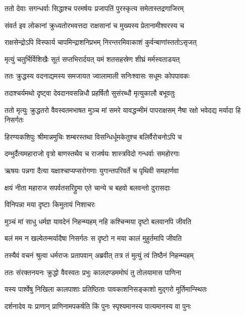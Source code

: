 \twolineshloka
{ततो देवाः सगन्धर्वाः सिद्धाश्च परमर्षयः}
{प्रजापतिं पुरस्कृत्य समेतास्तद्रणाजिरम्} %

\twolineshloka
{संवर्त इव लोकानां क्रुध्यतोरभवत्तदा}
{राक्षसानां च मुख्यस्य प्रेतानामीश्वरस्य च} %

\twolineshloka
{राक्षसेन्द्रोऽपि विस्फार्य चापमिन्द्राशनिप्रभम्}
{निरन्तरमिवाकाशं कुर्वन्बाणांस्ततोऽसृजत्} %

\twolineshloka
{मृत्युं चतुर्भिर्विशिखैः सूतं सप्तभिरार्दयत्}
{यमं शतसहस्रेण शीघ्रं मर्मस्वताडयत्} %

\twolineshloka
{ततः क्रुद्धस्य वदनाद्यमस्य समजायत}
{ज्वालामाली सनिःश्वासः सधूमः कोपपावकः} %

\twolineshloka
{तदाश्चर्यमथो दृष्ट्वा देवदानवसन्निधौ}
{प्रहर्षितौ सुसंरब्धौ मृत्युकालौ बभूवतुः} %

\threelineshloka
{ततो मृत्युः क्रुद्धतरो वैवस्वतमभाषत}
{मुञ्च मां समरे यावद्धन्मीमं पापराक्षसम्}
{नैषा रक्षो भवेदद्य मर्यादा हि निसर्गतः} %

\twolineshloka
{हिरण्यकशिपुः श्रीमान्नमुचिः शम्बरस्तथा}
{विसन्धिर्धूमकेतुश्च बलिर्वैरोचनोऽपि च} %

\twolineshloka
{दम्भुर्दैत्यमहाराजो वृत्रो बाणस्तथैव च}
{राजर्षयः शास्त्रविदो गन्धर्वाः समहोरगाः} %

\twolineshloka
{ऋषयः पन्नगा दैत्या यक्षाश्चाप्यप्सरोगणाः}
{युगान्तपरिवर्ते च पृथिवी समहार्णवा} %

\twolineshloka
{क्षयं नीता महाराज सपर्वतसरिद्द्रुमा}
{एते चान्ये च बहवो बलवन्तो दुरासदाः} %

\onelineshloka
{विनिपन्ना मया दृष्टाः किमुतायं निशाचरः} %

\twolineshloka
{मुञ्चं मां साधु धर्मज्ञ यावदेनं निहन्म्यहम्}
{नहि कश्चिन्मया दृष्टो बलवानपि जीवति} %

\twolineshloka
{बलं मम न खल्वेतन्मर्यादैषा निसर्गतः}
{स दृष्टो न मया कालं मुहुर्तमापि जीवति} %

\twolineshloka
{तस्यैवं वचनं श्रुत्वा धर्मराजः प्रतापवान्}
{अब्रवीत् तत्र तं मुत्युं त्वं तिष्ठैनं निहन्म्यहम्} %

\twolineshloka
{ततः संरक्तनयनः क्रुद्धो वैवस्वतः प्रभुः}
{कालदण्डममोघं तु तोलयामास पाणिना} %

\twolineshloka
{यस्य पार्श्वेषु निखिला कालपाशाः प्रतिष्ठिताः}
{पावकाशनिसङ्काशो मुद्गरो मूर्तिमान्स्थितः} %

\twolineshloka
{दर्शनादेव यः प्राणान् प्राणिनामपकर्षति}
{किं पुनः स्पृश्यमानस्य पात्यमानस्य वा पुनः} %

